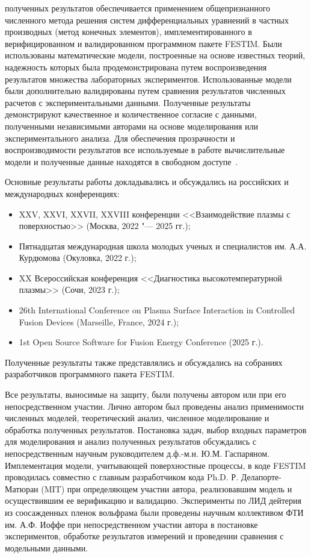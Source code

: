 {\reliability} полученных результатов обеспечивается применением общепризнанного численного метода решения систем дифференциальных уравнений в частных производных (метод конечных элементов), имплементированного в верифицированном и валидированном программном пакете FESTIM. Были использованы математические модели, построенные на основе известных теорий, надежность которых была продемонстрирована путем воспроизведения результатов множества лабораторных экспериментов. Использованные модели были дополнительно валидированы путем сравнения результатов численных расчетов с экспериментальными данными. Полученные результаты демонстрируют качественное и количественное согласие с данными, полученными независимыми авторами на основе моделирования или экспериментального анализа. Для обеспечения прозрачности и воспроизводимости результатов все используемые в работе вычислительные модели и полученные данные находятся в свободном доступе~\cite{Kulagin_PhD_2025}.

{\probation}
Основные результаты работы докладывались и обсуждались на российских и международных конференциях:
\begin{itemize}
    \item XXV, XXVI, XXVII, XXVIII конференции <<Взаимодействие плазмы с поверхностью>> (Москва, 2022 "--- 2025 гг.);
    \item Пятнадцатая международная школа молодых ученых и специалистов им. А.А. Курдюмова (Окуловка, 2022 г.);
    \item XX Всероссийская конференция <<Диагностика высокотемпературной плазмы>> (Сочи, 2023 г.);
    \item 26th International Conference on Plasma Surface Interaction in Controlled Fusion Devices (Marseille, France, 2024 г.);
    \item 1st Open Source Software for Fusion Energy Conference (2025 г.).
\end{itemize}
Полученные результаты также представлялись и обсуждались на собраниях разработчиков программного пакета FESTIM. 

{\contribution} Все результаты, выносимые на защиту, были получены автором или при его непосредственном участии. Лично автором был проведены анализ применимости численных моделей, теоретический анализ, численное моделирование и обработка полученных результатов. Постановка задач, выбор входных параметров для моделирования и анализ полученных результатов обсуждались с непосредственным научным руководителем д.ф.-м.н. Ю.М. Гаспаряном. Имплементация модели, учитывающей поверхностные процессы, в коде FESTIM проводилась совместно с главным разработчиком кода Ph.D. Р. Делапорте-Матюран (MIT) при определяющем участии автора, реализовавшим модель и осуществившим ее верификацию и валидацию. Эксперименты по ЛИД дейтерия из соосажденных пленок вольфрама были проведены научным коллективом ФТИ им. А.Ф. Иоффе при непосредственном участии автора в постановке экспериментов, обработке результатов измерений и проведении сравнения с модельными данными.

